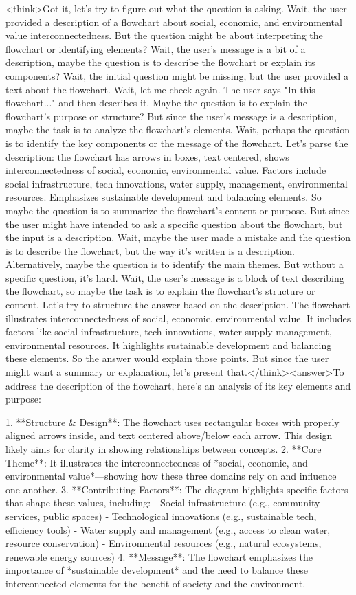 <think>Got it, let's try to figure out what the question is asking. Wait, the user provided a description of a flowchart about social, economic, and environmental value interconnectedness. But the question might be about interpreting the flowchart or identifying elements? Wait, the user's message is a bit of a description, maybe the question is to describe the flowchart or explain its components? Wait, the initial question might be missing, but the user provided a text about the flowchart. Wait, let me check again. The user says "In this flowchart..." and then describes it. Maybe the question is to explain the flowchart's purpose or structure? But since the user's message is a description, maybe the task is to analyze the flowchart's elements. Wait, perhaps the question is to identify the key components or the message of the flowchart. Let's parse the description: the flowchart has arrows in boxes, text centered, shows interconnectedness of social, economic, environmental value. Factors include social infrastructure, tech innovations, water supply, management, environmental resources. Emphasizes sustainable development and balancing elements. So maybe the question is to summarize the flowchart's content or purpose. But since the user might have intended to ask a specific question about the flowchart, but the input is a description. Wait, maybe the user made a mistake and the question is to describe the flowchart, but the way it's written is a description. Alternatively, maybe the question is to identify the main themes. But without a specific question, it's hard. Wait, the user's message is a block of text describing the flowchart, so maybe the task is to explain the flowchart's structure or content. Let's try to structure the answer based on the description. The flowchart illustrates interconnectedness of social, economic, environmental value. It includes factors like social infrastructure, tech innovations, water supply management, environmental resources. It highlights sustainable development and balancing these elements. So the answer would explain those points. But since the user might want a summary or explanation, let's present that.</think><answer>To address the description of the flowchart, here’s an analysis of its key elements and purpose:  

1. **Structure & Design**: The flowchart uses rectangular boxes with properly aligned arrows inside, and text centered above/below each arrow. This design likely aims for clarity in showing relationships between concepts.  
2. **Core Theme**: It illustrates the interconnectedness of *social, economic, and environmental value*—showing how these three domains rely on and influence one another.  
3. **Contributing Factors**: The diagram highlights specific factors that shape these values, including:  
   - Social infrastructure (e.g., community services, public spaces)  
   - Technological innovations (e.g., sustainable tech, efficiency tools)  
   - Water supply and management (e.g., access to clean water, resource conservation)  
   - Environmental resources (e.g., natural ecosystems, renewable energy sources)  
4. **Message**: The flowchart emphasizes the importance of *sustainable development* and the need to balance these interconnected elements for the benefit of society and the environment.  


